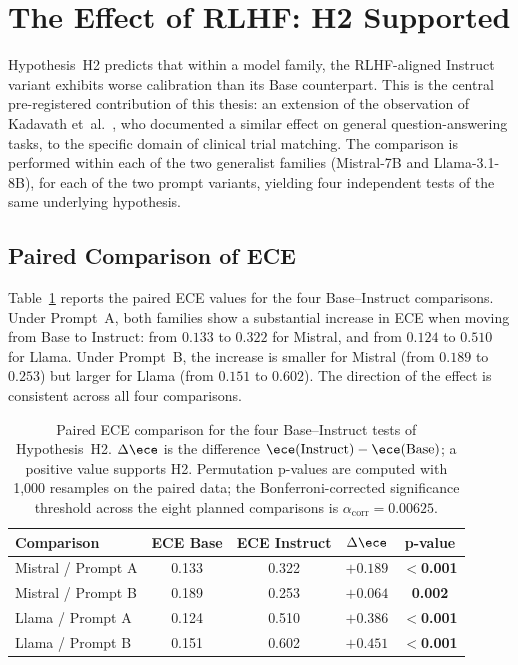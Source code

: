 \section{The Effect of RLHF: H2 Supported}
\label{sec:res-h2}

Hypothesis~H2 predicts that within a model family, the RLHF-aligned 
Instruct variant exhibits worse calibration than its Base counterpart. 
This is the central pre-registered contribution of this thesis: an 
extension of the observation of Kadavath et~al.~\cite{kadavath2022know}, 
who documented a similar effect on general question-answering tasks, to 
the specific domain of clinical trial matching. The comparison is 
performed within each of the two generalist families (Mistral-7B and 
Llama-3.1-8B), for each of the two prompt variants, yielding four 
independent tests of the same underlying hypothesis.

\subsection{Paired Comparison of ECE}
\label{subsec:res-h2-paired}

Table~\ref{tab:res-h2-paired} reports the paired ECE values for the four 
Base--Instruct comparisons. Under Prompt~A, both families show a 
substantial increase in ECE when moving from Base to Instruct: from 
$0.133$ to $0.322$ for Mistral, and from $0.124$ to $0.510$ for Llama. 
Under Prompt~B, the increase is smaller for Mistral (from $0.189$ to 
$0.253$) but larger for Llama (from $0.151$ to $0.602$). The direction 
of the effect is consistent across all four comparisons.

\begin{table}[htbp]
    \centering
    \caption{Paired ECE comparison for the four Base--Instruct tests of 
        Hypothesis~H2. $\Delta\ece$ is the difference $\ece(\text{Instruct}) 
        - \ece(\text{Base})$; a positive value supports H2. Permutation 
        p-values are computed with 1{,}000 resamples on the paired data; 
        the Bonferroni-corrected significance threshold across the eight 
        planned comparisons is $\alpha_{\text{corr}} = 0.00625$.}
    \label{tab:res-h2-paired}
    \small
    \begin{tabular}{@{}lccc>{\bfseries}c@{}}
        \toprule
        \textbf{Comparison} & 
        \textbf{ECE Base} & 
        \textbf{ECE Instruct} & 
        \boldmath$\Delta\ece$ & 
        \textbf{p-value} \\
        \midrule
        Mistral / Prompt A   & 0.133 & 0.322 & $+0.189$ & $<$0.001 \\
        Mistral / Prompt B   & 0.189 & 0.253 & $+0.064$ & 0.002 \\
        Llama / Prompt A     & 0.124 & 0.510 & $+0.386$ & $<$0.001 \\
        Llama / Prompt B     & 0.151 & 0.602 & $+0.451$ & $<$0.001 \\
        \bottomrule
    \end{tabular}
\end{table}

